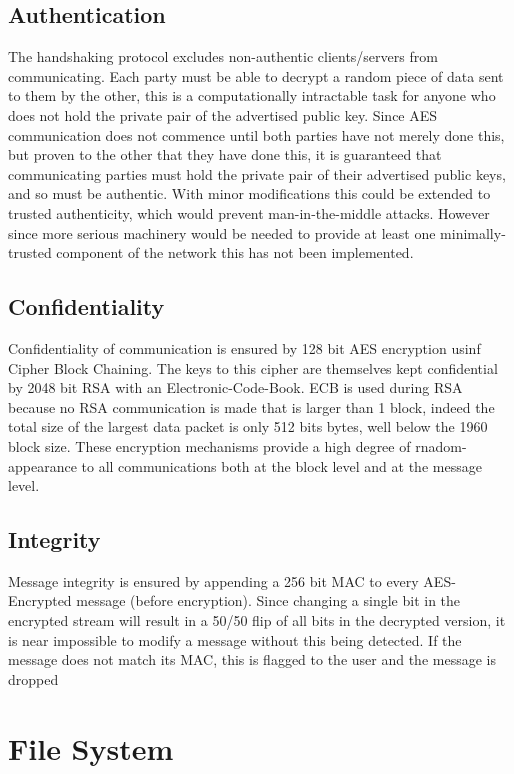 \subsection{Authentication}
The handshaking protocol excludes non-authentic clients/servers from communicating.
Each party must be able to decrypt a random piece of data sent to them by the other, this is a computationally intractable task for anyone who does not hold the private pair of the advertised public key.
Since AES communication does not commence until both parties have not merely done this, but proven to the other that they have done this, it is guaranteed that communicating parties must hold the private pair of their advertised public keys, and so must be authentic.
With minor modifications this could be extended to trusted authenticity, which would prevent man-in-the-middle attacks.
However since more serious machinery would be needed to provide at least one minimally-trusted component of the network this has not been implemented.
\subsection{Confidentiality}
Confidentiality of communication is ensured by 128 bit AES encryption usinf Cipher Block Chaining.
The keys to this cipher are themselves kept confidential by 2048 bit RSA with an Electronic-Code-Book.
ECB is used during RSA because no RSA communication is made that is larger than 1 block, indeed the total size of the largest data packet is only 512 bits bytes, well below the 1960 block size.
These encryption mechanisms provide a high degree of rnadom-appearance to all communications both at the block level and at the message level.
\subsection{Integrity}
Message integrity is ensured by appending a 256 bit MAC to every AES-Encrypted message (before encryption).
Since changing a single bit in the encrypted stream will result in a 50/50 flip of all bits in the decrypted version, it is near impossible to modify a message without this being detected.
If the message does not match its MAC, this is flagged to the user and the message is dropped

\section{File System}





